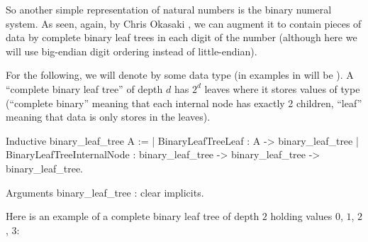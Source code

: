 \documentclass{article}
\begin{document}
So another simple representation of natural numbers is the binary numeral system. As seen, again, by Chris Okasaki \cite{okasaki_1998}, we can augment it to contain pieces of data by complete binary leaf trees in each digit of the number (although here we will use big-endian digit ordering instead of little-endian).

For the following, we will denote by  some data type (in examples in will be ). A ``complete binary leaf tree'' of depth $d$ has $2^d$ leaves where it stores values of type  (``complete binary'' meaning that each internal node has exactly 2 children, ``leaf'' meaning that data is only stores in the leaves).

\begin{coq}
Inductive binary_leaf_tree {A} :=
  | BinaryLeafTreeLeaf : A -> binary_leaf_tree
  | BinaryLeafTreeInternalNode : binary_leaf_tree -> binary_leaf_tree -> binary_leaf_tree.

Arguments binary_leaf_tree : clear implicits.
\end{coq}

Here is an example of a complete binary leaf tree of depth $2$ holding values $0$, $1$, $2$, $3$:
\end{document}
